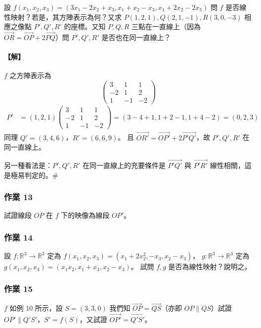 \begin{example}\label{ex:b6s-1-10}
設 $f(x_1, x_2, x_3) = (3x_1 - 2x_2 + x_3, x_1 + x_2 - x_3, x_1 + 2x_2 - 2x_3)$ 問 $f$ 是否線性映射？若是，其方陣表示為何？又求 $P(1, 2, 1), Q(2, 1, -1), R(3, 0, -3)$ 相應之像點 $P', Q', R'$ 的座標。又知 $P, Q, R$ 三點在一直線上（因為 $\vec{OR} = \vec{OP} + 2\vec{PQ}$）問 $P', Q', R'$ 是否也在同一直線上？
\end{example}

\paragraph{【解】}
$f$ 之方陣表示為
\[ \begin{pmatrix} 3 & 1 & 1 \\ -2 & 1 & 2 \\ 1 & -1 & -2 \end{pmatrix} \]
\begin{align*}
P' &= (1, 2, 1) \begin{pmatrix} 3 & 1 & 1 \\ -2 & 1 & 2 \\ 1 & -1 & -2 \end{pmatrix} = (3-4+1, 1+2-1, 1+4-2) = (0, 2, 3)
\end{align*}
同理 $Q' = (3, 4, 6)$，$R' = (6, 6, 9)$。
且 $\vec{OR'} = \vec{OP'} + 2\vec{P'Q'}$，故 $P', Q', R'$ 在同一直線上。

另一種看法是：$P', Q', R'$ 在同一直線上的充要條件是 $\vec{P'Q'}$ 與 $\vec{P'R'}$ 線性相關，這是極易判定的。\hfill$\#$

\subsubsection*{作業 13}\label{hw:b6s-1-13}
試證線段 $OP$ 在 $f$ 下的映像為線段 $OP'$。

\subsubsection*{作業 14}\label{hw:b6s-1-14}
設 $f: \mathbb{R}^3 \longrightarrow \mathbb{R}^3$ 定為 $f(x_1, x_2, x_3) = (x_1 + 2x_2^2, -x_3, x_2 - x_3)$，
$g: \mathbb{R}^3 \longrightarrow \mathbb{R}^3$ 定為 $g(x_1, x_2, x_3) = (x_1 x_2, x_1 + x_3, x_2 - x_3)$。
試問 $f, g$ 是否為線性映射？說明之。

\subsubsection*{作業 15}\label{hw:b6s-1-15}
$f$ 如例 10 所示，設 $S=(3, 3, 0)$ 我們知 $\vec{OP} = \vec{QS}$（亦即 $OP \parallel QS$）試證 $OP' \parallel Q'S'$，$S'=f(S)$，又試證 $\vec{OP'} = \vec{Q'S'}$。

